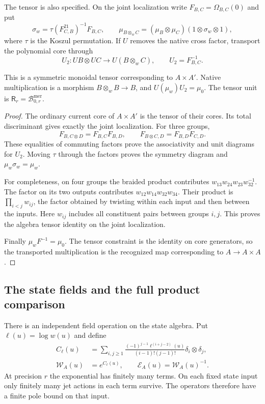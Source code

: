The tensor is also specified. On the joint localization write
$F_{B,C}=\Omega_{B,C}(0)$ and put
\[
 \sigma_w=\tau(F_{C,B}^{21})^{-1}F_{B,C},\qquad
 \mu_{B\otimes_w C}=(\mu_B\otimes\mu_C)
                           (1\otimes\sigma_w\otimes1),
\]
where $\tau$ is the Koszul permutation. If $U$ removes the native
cross factor, transport the polynomial core through
\begin{equation}\label{cycmp:eq:source-tensor}
 U_2:UB\otimes UC\longrightarrow U(B\otimes_w C),
 \qquad U_2=F_{B,C}^{-1}.
\end{equation}

\begin{lemma}\label{cycmp:lem:source-tensor}
This is a symmetric monoidal tensor corresponding to $A\times A'$.
Native multiplication is a morphism $B\otimes_w B\to B$, and
$U(\mu_w)U_2=\mu_0$. The tensor unit is
$\mathsf R_r=\mathcal B_{0,r}^{\mathrm{mer}}$.
\end{lemma}

\begin{proof}
The ordinary current core of $A\times A'$ is the tensor of their
cores. Its total discriminant gives exactly the joint localization.
For three groups,
\[
 F_{B,C\otimes D}=F_{B,C}F_{B,D},\qquad
 F_{B\otimes C,D}=F_{B,D}F_{C,D}.
\]
These equalities of commuting factors prove the associativity and
unit diagrams for $U_2$. Moving $\tau$ through the factors proves
the symmetry diagram and $\mu_w\sigma_w=\mu_w$.

For completeness, on four groups the braided product contributes
$w_{13}w_{24}w_{23}w_{32}^{-1}$. The factor on its two outputs
contributes $w_{12}w_{14}w_{32}w_{34}$. Their product is
$\prod_{i<j}w_{ij}$, the factor obtained by twisting within each
input and then between the inputs. Here $w_{ij}$ includes all
constituent pairs between groups $i,j$. This proves the algebra
tensor identity on the joint localization.

Finally $\mu_wF^{-1}=\mu_0$. The tensor constraint is the identity
on core generators, so the transported multiplication is the
recognized map corresponding to $A\to A\times A$.
\end{proof}

\subsection{The state fields and the full product comparison}

There is an independent field operation on the state algebra.
Put $\ell(u)=\log w(u)$ and define
\begin{equation}\label{cycmp:eq:state-contraction}
 \begin{split}
 C_\ell(u)&=\sum_{i,j\ge1}
  \frac{(-1)^{j-1}\ell^{(i+j-2)}(u)}{(i-1)!(j-1)!}
                      \delta_i\otimes\delta_j,\\
 \mathcal W_A(u)&=e^{C_\ell(u)},\qquad
 \mathcal E_A(u)=\mathcal W_A(u)^{-1}.
 \end{split}
\end{equation}
At precision $r$ the exponential has finitely many terms. On each
fixed state input only finitely many jet actions in each term survive.
The operators therefore have a finite pole bound on that input.

